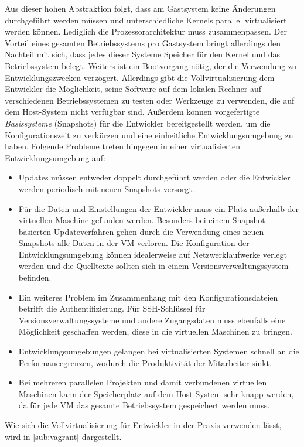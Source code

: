 Aus dieser hohen Abstraktion folgt, dass am Gastsystem keine Änderungen durchgeführt werden müssen und unterschiedliche Kernels parallel virtualisiert werden können.
Lediglich die Prozessorarchitektur muss zusammenpassen.
Der Vorteil eines gesamten Betriebssystems pro Gastsystem bringt allerdings den Nachteil mit sich, dass jedes dieser Systeme Speicher für den Kernel und das Betriebssystem belegt. Weiters ist ein Bootvorgang nötig, der die Verwendung zu Entwicklungszwecken verzögert.
Allerdings gibt die Vollvirtualisierung dem Entwickler die Möglichkeit, seine Software auf dem lokalen Rechner auf verschiedenen Betriebssystemen zu testen oder Werkzeuge zu verwenden, die auf dem Host-System nicht verfügbar sind.
Außerdem können vorgefertigte \emph{Basissysteme} (Snapshots) für die Entwickler bereitgestellt werden, um die Konfigurationszeit zu verkürzen und eine einheitliche Entwicklungsumgebung zu haben.
Folgende Probleme treten hingegen in einer virtualisierten Entwicklungsumgebung auf:
\begin{itemize}
\item Updates müssen entweder doppelt durchgeführt werden oder die Entwickler werden periodisch mit neuen Snapshots versorgt.
\item Für die Daten und Einstellungen der Entwickler muss ein Platz außerhalb der virtuellen Maschine gefunden werden. Besonders bei einem Snapshot-basierten Updateverfahren gehen durch die Verwendung eines neuen Snapshots alle Daten in der VM verloren. Die Konfiguration der Entwicklungsumgebung können idealerweise auf Netzwerklaufwerke verlegt werden und die Quelltexte sollten sich in einem Versionsverwaltungssystem befinden.
\item Ein weiteres Problem im Zusammenhang mit den Konfigurationsdateien betrifft die Authentifizierung. Für SSH-Schlüssel für Versionsverwaltungssysteme und andere Zugangsdaten muss ebenfalls eine Möglichkeit geschaffen werden, diese in die virtuellen Maschinen zu bringen.
\item Entwicklungsumgebungen gelangen bei virtualisierten Systemen schnell an die Performancegrenzen, wodurch die Produktivität der Mitarbeiter sinkt.
\item Bei mehreren parallelen Projekten und damit verbundenen virtuellen Maschinen kann der Speicherplatz auf dem Host-System sehr knapp werden, da für jede VM das gesamte Betriebssystem gespeichert werden muss.
\end{itemize}
Wie sich die Vollvirtualisierung für Entwickler in der Praxis verwenden lässt, wird in \cref{sub:vagrant} dargestellt.

